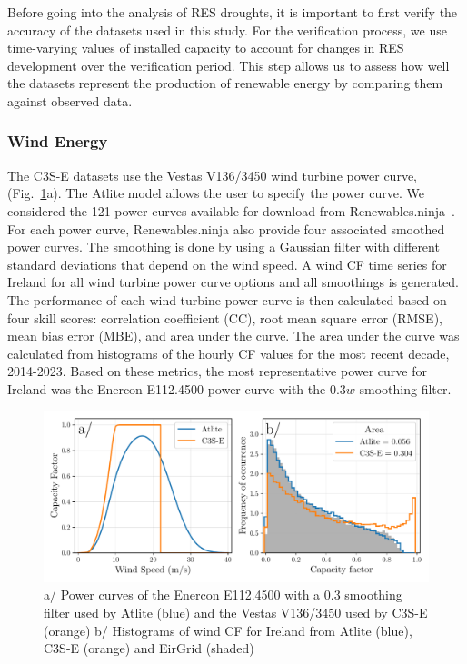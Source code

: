 \documentclass[a4paper, 11pt]{article}
\begin{document}
Before going into the analysis of RES droughts, it is important to first verify the accuracy of the datasets used in this study. For the verification process, we use time-varying values of installed capacity to account for changes in RES development over the verification period. This step allows us to assess how well the datasets represent the production of renewable energy by comparing them against observed data.
	
\subsubsection{Wind Energy}
\label{sec:wind_verification}

The C3S-E datasets use the Vestas V136/3450 wind turbine power curve, (Fig.~\ref{fig:power_curve}a). The Atlite model allows the user to specify the power curve. We considered the 121 power curves available for download from Renewables.ninja~\cite{staffell2016wake}. For each power curve, Renewables.ninja also provide four associated smoothed power curves. The smoothing is done by using a Gaussian filter with different standard deviations that depend on the wind speed. A wind CF time series for Ireland for all wind turbine power curve options and all smoothings is generated. The performance of each wind turbine power curve is then calculated based on four skill scores: correlation coefficient (CC), root mean square error (RMSE), mean bias error (MBE), and area under the curve. The area under the curve was calculated from histograms of the hourly CF values for the most recent decade, 2014-2023. Based on these metrics, the most representative power curve for Ireland was the Enercon E112.4500 power curve with the $0.3w$  smoothing filter.

\begin{figure}[!ht]
	\centering
	\includegraphics[width=\textwidth]{verification_power_curve}
	\caption{a/ Power curves of the Enercon E112.4500 with a 0.3 smoothing filter used by Atlite (blue) and the Vestas V136/3450 used by C3S-E (orange) b/ Histograms of wind CF for Ireland from Atlite (blue), C3S-E (orange) and EirGrid (shaded)}
	\label{fig:power_curve}
\end{figure}
\end{document}
